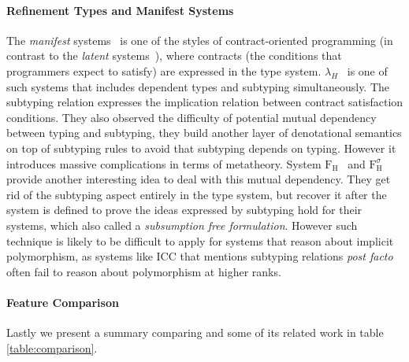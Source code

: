 \paragraph{Refinement Types and Manifest Systems}

The \emph{manifest} systems~\citep{manifestcontracts} is one of the styles of
contract-oriented programming (in contrast to the \emph{latent} systems~\citep{latentcontracts}),
where contracts (the conditions that programmers expect to satisfy) are expressed
in the type system. $\lambda_H$~\citep{hybridtypes,manifestcontracts} is one of such systems that
includes dependent types and subtyping simultaneously. The subtyping relation
expresses the implication relation between contract satisfaction conditions. They
also observed the difficulty of potential mutual dependency between typing and subtyping,
they build another layer of denotational semantics on top of
subtyping rules to avoid that subtyping depends on typing. However it introduces
massive complications in terms of metatheory. System $\mathrm{F}_\mathrm{H}$~\citep{fh} and $\mathrm{F}_\mathrm{H}^\sigma$
~\citep{fhsigma} provide another
interesting idea to deal with this mutual dependency. They get rid of the
subtyping aspect entirely in the type system, but recover it after the system is
defined to prove the ideas expressed by subtyping hold for their systems,
which \citet{fhsigma} also called a \emph{subsumption free formulation}.
However such technique is likely to be difficult to apply for systems that
reason about implicit polymorphism,
as systems like ICC\citep{miquel2001implicit} that mentions subtyping relations \emph{post facto}
often fail to reason about polymorphism at higher ranks.

\paragraph{Feature Comparison}

Lastly we present a summary comparing \name and some of its related work in table \ref{table:comparison}.

